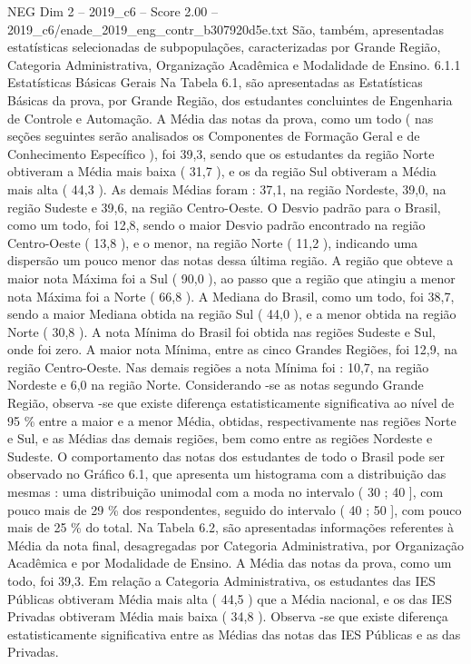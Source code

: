 \begin{textsample}{NEG Dim 2 – 2019\_c6 – Score 2.00 – 2019\_c6/enade\_2019\_eng\_contr\_b307920d5e.txt}
São, também, apresentadas estatísticas selecionadas de subpopulações, caracterizadas por Grande Região, Categoria Administrativa, Organização Acadêmica e Modalidade de Ensino. 6.1.1 Estatísticas Básicas Gerais Na Tabela 6.1, são apresentadas as Estatísticas Básicas da prova, por Grande Região, dos estudantes concluintes de Engenharia de Controle e Automação.
A Média das notas da prova, como um todo ( nas seções seguintes serão analisados os Componentes de Formação Geral e de Conhecimento Específico ), foi 39,3, sendo que os estudantes da região Norte obtiveram a Média mais baixa ( 31,7 ), e os da região Sul obtiveram a Média mais alta ( 44,3 ).
As demais Médias foram : 37,1, na região Nordeste, 39,0, na região Sudeste e 39,6, na região Centro-Oeste.
O Desvio padrão para o Brasil, como um todo, foi 12,8, sendo o maior Desvio padrão encontrado na região Centro-Oeste ( 13,8 ), e o menor, na região Norte ( 11,2 ), indicando uma dispersão um pouco menor das notas dessa última região.
A região que obteve a maior nota Máxima foi a Sul ( 90,0 ), ao passo que a região que atingiu a menor nota Máxima foi a Norte ( 66,8 ).
A Mediana do Brasil, como um todo, foi 38,7, sendo a maior Mediana obtida na região Sul ( 44,0 ), e a menor obtida na região Norte ( 30,8 ).
A nota Mínima do Brasil foi obtida nas regiões Sudeste e Sul, onde foi zero.
A maior nota Mínima, entre as cinco Grandes Regiões, foi 12,9, na região Centro-Oeste.
Nas demais regiões a nota Mínima foi : 10,7, na região Nordeste e 6,0 na região Norte.
Considerando -se as notas segundo Grande Região, observa -se que existe diferença estatisticamente significativa ao nível de 95 \% entre a maior e a menor Média, obtidas, respectivamente nas regiões Norte e Sul, e as Médias das demais regiões, bem como entre as regiões Nordeste e Sudeste.
O comportamento das notas dos estudantes de todo o Brasil pode ser observado no Gráfico 6.1, que apresenta um histograma com a distribuição das mesmas : uma distribuição unimodal com a moda no intervalo ( 30 ; 40 ], com pouco mais de 29 \% dos respondentes, seguido do intervalo ( 40 ; 50 ], com pouco mais de 25 \% do total.
Na Tabela 6.2, são apresentadas informações referentes à Média da nota final, desagregadas por Categoria Administrativa, por Organização Acadêmica e por Modalidade de Ensino.
A Média das notas da prova, como um todo, foi 39,3.
Em relação a Categoria Administrativa, os estudantes das IES Públicas obtiveram Média mais alta ( 44,5 ) que a Média nacional, e os das IES Privadas obtiveram Média mais baixa ( 34,8 ).
Observa -se que existe diferença estatisticamente significativa entre as Médias das notas das IES Públicas e as das Privadas.

\end{textsample}
